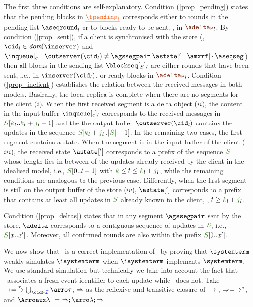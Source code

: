 The  first three conditions are self-explanatory. Condition (\ref{prop_pending})  states that the pending blocks in $\flatten{\tpending_l}$  
corresponds either to  rounds in the  pending list  $\pending_l$ or  to blocks ready to 
be sent, \ie, in ${\pushbuffer}_l$.
By condition (\ref{prop_sent}), if a client is synchronised with the store 
(\ie, $\cid_l \in \dom\inserver$ and $\inclient \cdot\outserver(\cid_l) \neq \agssegpair[{\astate[']}][{\amxrf}]\cdot\aseqseg$) 
then  all  blocks  in  the sending list $\tsent_l$  are either rounds 
that have been sent, i.e., in $\inserver(\cid_l)$, or ready blocks in ${\pushbuffer}_l$.
Condition (\ref{prop_inclient}) establishes the relation between the received messages in both models. Basically, 
the local replica 
is complete  when there are no segments for the client ($i$).%
When the first received segment is a delta object ($ii$),
 the  content in the input buffer $\inclient_l$ corresponds to the received messages in $\queuemessage[\tknown_l..\tknown_l+\treceivebuffer_l-1]$
and the the  output buffer $\outserver(\cid_l)$ contains the  updates in the 
sequence $\queuemessage[\tknown_l+\treceivebuffer_l..|\queuemessage| - 1]$. 
In the remaining two  cases, the first segment  contains a state. 
When the segment is  
in the input buffer of the client ($iii$), 
the received state $\astate[']$ corresponds to a prefix of the sequence $\queuemessage$ 
whose length lies in between of the updates already received by the client in the 
idealised model, i.e., 
$\queuemessage[0 .. t - 1]$ with  $\tknown\leq t \leq \tknown_l+\treceivebuffer_l$, while the remaining
conditions are analogous to the previous case.  Differently, when the 
first segment is still on the output buffer of the store ($iv$),  $\astate[']$  corresponds to a
 prefix that contains at least all  updates in $\queuemessage$ already known to the client, 
 \ie, $t \geq \tknown_l+\treceivebuffer_l $.    
 
 Condition (\ref{prop_deltas}) states that in  any segment $\agssegpair$  sent by the 
 store, $\adelta$ corresponds to a contiguous sequence of updates in $\queuemessage$, i.e., $\queuemessage[x..x']$. 
 Moreover, all confirmed rounds are also within the prefix $\queuemessage[0..x']$.


We  now show that \igsp\ is a correct implementation of \gsp\ by proving that 
%
%
$\systemterm$ weakly simulates $\isystemterm$ 
when
 $\isystemterm$  implements $\systemterm$.
 We use standard simulation %
 but technically we take into account the fact that
 \gsp\ associates a fresh event identifier to each update while \igsp\ does not. Take  $\rightarrow = \tr{\tau} \bigcup_{\cid\in\idset} \arroi{\tau}$,
 $\Rightarrow$ as the reflexive and transitive closure of $\rightarrow$, \ie $\Rightarrow = \rightarrow^*$, and 
 $\Arroi{\lambda} \ = \ \Arro;\arroi{\lambda};\Arro$.
 
